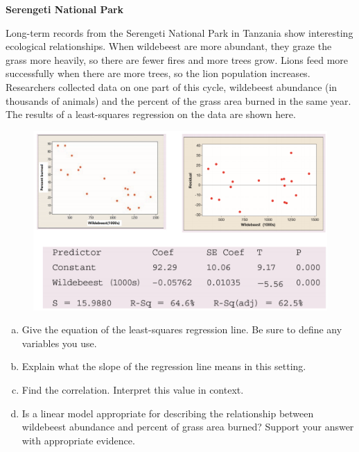 \documentclass[a4paper, 12pt,twoside]{book}
\begin{document}
\colorbox{champagne}{
\begin{minipage}{\textwidth}
\textbf{Serengeti National Park}\vspace{0.3cm}

Long-term records from the Serengeti National Park in Tanzania show interesting ecological relationships. When wildebeest are more abundant, they graze the grass more heavily, so there are fewer fires and more trees grow.  Lions feed more successfully when there are more trees, so the lion population increases. Researchers collected data on one part of this cycle, wildebeest abundance (in thousands of animals) and the percent of the grass area burned in the same year. The results of a least-squares regression on the data are shown here.
        
           \begin{figure}[H]
           \centering
           \includegraphics[scale=0.6]{LRExercise}
           \end{figure}
    
        \begin{enumerate}[(a)]
            \item Give the equation of the least-squares regression line. Be sure to define any variables you use.
            \item Explain what the slope of the regression line means in this setting.
            \item Find the correlation. Interpret this value in context.
            \item Is a linear model appropriate for describing the relationship between wildebeest abundance and percent of grass area burned? Support your answer with appropriate evidence.
        \end{enumerate}
\end{minipage}
}
\end{document}
